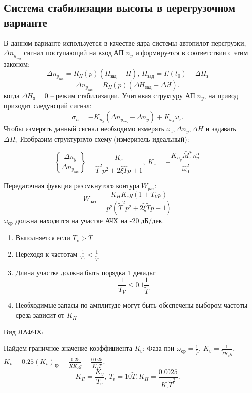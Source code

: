 \documentclass{article}
\begin{document}
\subsection{Система стабилизации высоты в перегрузочном варианте}
В данном варианте используется в качестве ядра системы автопилот перегрузки, $
	\Delta n_{y_\text{зад}}$ сигнал поступающий на вход АП $n_y$ и формируется в
соответствии с этим законом:
\[
	\Delta n_{y_\text{зад}} = R_H(p) (H_\text{зад} - H), \ H_\text{зад} =
	H(t_0) + \Delta H_\text{з}
\]
\[
	\Delta n_{y_\text{зад}} = R_H(p) (\Delta H_\text{зад} - \Delta H)
	.\]
когда $\Delta H_\text{з} = 0$ -- режим стабилизации. Учитывая структуру АП
$n_y$, на привод приходит следующий сигнал:
\[
	\sigma_n = -K_{n_y} ( \Delta n_{y_\text{зад}} - \Delta n_y) + K_{\omega_z}
	\omega_z
	.\]
Чтобы измерять данный сигнал необходимо измерять $\omega_z, \Delta n_y, \Delta
	H$ и задавать $\Delta H_\text{з}$
Изобразим структурную схему (измеритель идеальный):
\begin{figure}[H]
	\centering
	\label{fig:fig_44}
\end{figure}
\[
	\left\{ \frac{ \Delta n_y}{ \Delta n_{y_\text{зад}}} \right\}  =
	\frac{K_\varepsilon}{ \hat{T}^2 p^2 + 2 \hat{\xi} \hat{T}p + 1 }, \
	K_\varepsilon = - \frac{K_{n_y} \bar{M}_z^{\varphi} n_y^\alpha
	}{\hat{\omega}_0^2}
\]

Передаточная функция разомкнутого контура $W_\text{раз}$:
\[
	W_\text{раз}  = \frac{K_H K_\varepsilon g (1 + T_V p)}{p^2 (\tilde{T}^2 p^2
		+ 2 \tilde{\xi} \tilde{T}p + 1)}
\]
$\omega_\text{ср}$ должна находится на участке АЧХ на -20 дБ/дек.
\begin{enumerate}
	\item Выполняется если $T_v > \tilde{T}$
	\item Переходя к частотам $\frac{1}{T_V} < \frac{1}{\tilde{T}}$
	\item Длина участке должна быть порядка 1 декады:
	      \[
		      \frac{1}{T_V} \le 0.1 \frac{1}{\tilde{T}}
	      \]
	\item Необходимые запасы по амплитуде могут быть обеспечены выбором частоты
	      среза зависит от $K_H$
\end{enumerate}
Вид ЛАФЧХ:
\begin{figure}[H]
	\centering
	\label{fig:fig_45}
\end{figure}

Найдем граничное значение коэффициента $K_v$:
Фаза при $\omega_\text{ср} = \frac{1}{\tilde{T}} $, $K_v = \frac{1}{\tilde{T}
		K_\varepsilon g}$, $K_v = 0.25 (K_v)_\text{гр} = \frac{0.25}{\tilde{K}
		K_\varepsilon g} = \frac{0.025}{K_\varepsilon \tilde{T}}$.
\[
	K_H = \frac{K_v}{T_v}, \ T_v = 10 \tilde{T}, K_H =
	\frac{0.0025}{K_\varepsilon \tilde{T}^2}
	.\]
\end{document}
